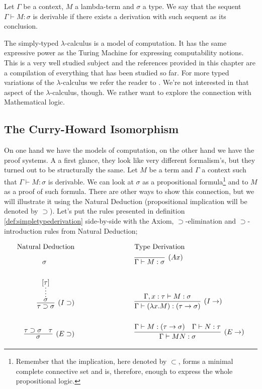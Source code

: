 \begin{mydef}[Derivability]
Let $\Gamma$ be a context, $M$ a lambda-term and $\sigma$ a type. We say that
the sequent $\Gamma \vdash M : \sigma$ is derivable if there exists a derivation with
such sequent as its conclusion.
\end{mydef}

The simply-typed $\lambda$-calculus is a model of computation. It has the same expressive power as
the Turing Machine for expressing computability notions. This is a very well studied subject
and the references provided in this chapter are a compilation of everything that
has been studied so far. For more typed variations of the $\lambda$-calculus we refer the reader
to \cite{Barendregt03}. We're not interested in that aspect of the $\lambda$-calculus, 
though. We rather want to explore the connection with Mathematical logic.

\subsection{The Curry-Howard Isomorphism}
\label{sec:background:curryhoward}

On one hand we have the models of computation, on the other hand we have the proof systems.
A a first glance, they look like very different formalism's, but they turned out to be
structurally the same. Let $M$ be a term and $\Gamma$ a context such that
$\Gamma \vdash M : \sigma$ is derivable. We can look at $\sigma$ as a propositional formula\footnote{
Remember that the implication, here denoted by $\subset$, forms a minimal complete connective set
and is, therefore, enough to express the whole propositional logic.
} and to $M$ as a proof of such formula. There are other ways to show this connection,
but we will illustrate it using the Natural Deduction\cite{Prawitz01} (propositional implication will be denoted by $\supset$). Let's put the rules presented in definition
\ref{def:simpletypederivation} side-by-side with the Axiom, $\supset$-elimination and
$\supset$-introduction rules from Natural Deduction;

\begin{center}
\begin{align*}
	\text{Natural Deduction} & \hspace{3cm} \text{Type Derivation} \\
	\sigma \hspace{1.4cm} & \hspace{3cm} \infer[(Ax)]{\Gamma \vdash M : \sigma}{}  \\[0.5cm]
	\infer[(I\supset)]{\tau \supset \sigma}{\infer*{\sigma}{[\tau]}}
		& \hspace{3cm} 
		\infer[(I\rightarrow)]{\Gamma \vdash (\lambda x . M) : (\tau \rightarrow \sigma)}
							  {\Gamma, x:\tau \vdash M : \sigma} \\[0.5cm]					  
	\infer[(E\supset)]{\sigma}{\tau \supset \sigma & \tau}
		& \hspace{3cm}
		\infer[(E\rightarrow)]{\Gamma \vdash MN : \sigma}
			{ \Gamma \vdash M : (\tau \rightarrow \sigma) & \Gamma \vdash N : \tau}
\end{align*} 
\end{center}

